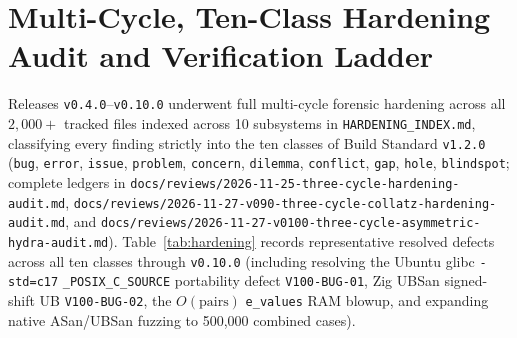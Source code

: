 \documentclass[11pt,reqno]{amsart}
\theoremstyle{plain}
\theoremstyle{definition}
\newcommand{\code}[1]{{\upshape\nolinkurl{#1}}}
\begin{document}
\section{Multi-Cycle, Ten-Class Hardening Audit and Verification Ladder}\label{sec:hardening}

Releases \texttt{v0.4.0}--\texttt{v0.10.0} underwent full multi-cycle forensic hardening across
all $2{,}000+$ tracked files indexed across 10 subsystems in \code{HARDENING_INDEX.md}, classifying
every finding strictly into the ten classes of Build Standard \texttt{v1.2.0} (\code{bug},
\code{error}, \code{issue}, \code{problem}, \code{concern}, \code{dilemma}, \code{conflict},
\code{gap}, \code{hole}, \code{blindspot}; complete ledgers in
\code{docs/reviews/2026-11-25-three-cycle-hardening-audit.md},
\code{docs/reviews/2026-11-27-v090-three-cycle-collatz-hardening-audit.md}, and
\code{docs/reviews/2026-11-27-v0100-three-cycle-asymmetric-hydra-audit.md}). Table~\ref{tab:hardening}
records representative resolved defects across all ten classes through \texttt{v0.10.0} (including
resolving the Ubuntu glibc \texttt{-std=c17} \code{_POSIX_C_SOURCE} portability defect
\code{V100-BUG-01}, Zig UBSan signed-shift UB \code{V100-BUG-02}, the $O(\text{pairs})$
\code{e_values} RAM blowup, and expanding native ASan/UBSan fuzzing to 500,000 combined cases).
\end{document}
